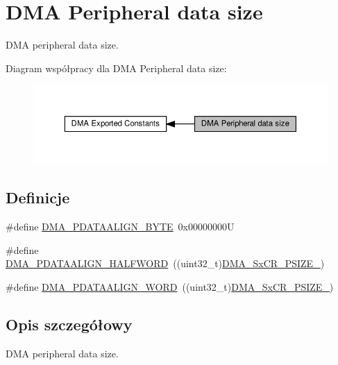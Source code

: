 \hypertarget{group___d_m_a___peripheral__data__size}{}\section{D\+MA Peripheral data size}
\label{group___d_m_a___peripheral__data__size}


D\+MA peripheral data size.  


Diagram współpracy dla D\+MA Peripheral data size\+:\nopagebreak
\begin{figure}[H]
\begin{center}
\leavevmode
\includegraphics[width=350pt]{group___d_m_a___peripheral__data__size}
\end{center}
\end{figure}
\subsection*{Definicje}
\begin{DoxyCompactItemize}
\item 
\#define \hyperlink{group___d_m_a___peripheral__data__size_ga55b8c8f5ec95f10d26d6c5b1c9136730}{D\+M\+A\+\_\+\+P\+D\+A\+T\+A\+A\+L\+I\+G\+N\+\_\+\+B\+Y\+TE}~0x00000000U
\item 
\#define \hyperlink{group___d_m_a___peripheral__data__size_gac08bfd907442dba5358830b247135bcc}{D\+M\+A\+\_\+\+P\+D\+A\+T\+A\+A\+L\+I\+G\+N\+\_\+\+H\+A\+L\+F\+W\+O\+RD}~((uint32\+\_\+t)\hyperlink{group___peripheral___registers___bits___definition_gab05cf3e3f7c9edae5c70d59b3b75b14f}{D\+M\+A\+\_\+\+Sx\+C\+R\+\_\+\+P\+S\+I\+Z\+E\+\_})
\item 
\#define \hyperlink{group___d_m_a___peripheral__data__size_gaad50e97cbc4a726660db9c3f42ac93b0}{D\+M\+A\+\_\+\+P\+D\+A\+T\+A\+A\+L\+I\+G\+N\+\_\+\+W\+O\+RD}~((uint32\+\_\+t)\hyperlink{group___peripheral___registers___bits___definition_ga8f376d0900380a3045cbeadd6a037302}{D\+M\+A\+\_\+\+Sx\+C\+R\+\_\+\+P\+S\+I\+Z\+E\+\_})
\end{DoxyCompactItemize}


\subsection{Opis szczegółowy}
D\+MA peripheral data size. 



